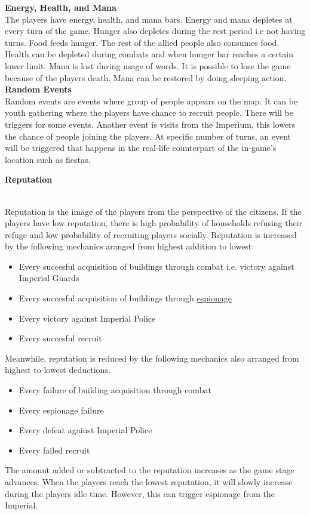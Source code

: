 \documentclass[11pt]{article}
\begin{document}
\textbf{Energy, Health, and Mana}\\
The players have energy, health, and mana bars. Energy  and mana depletes at every turn of the game. Hunger also depletes during the rest period i.e not having turns. Food feeds hunger. The rest of the allied people also consumes food. Health can be depleted during combats and when hunger bar reaches a certain lower limit. Mana is lost  during usage of words. It is possible to lose the game because of the players death. Mana can be restored by doing sleeping action.\\

\textbf{Random Events}\\
Random events are events where group of people appears on the map. It can be youth gathering where the players have chance to recruit people. There will be triggers for some events. Another event is visits from the Imperium, this lowers the chance of people joining the players.
At specific number of turns, an event will be triggered that happens in the real-life counterpart of the in-game's location such as fiestas.

\hypertarget{reputation}{\textbf{Reputation}}\\
Reputation is the image of the players from the perspective of the citizens. If the players have low reputation, there is high probability of households refusing their refuge and low probability of recruiting players socially.
Reputation is increased by the following mechanics aranged from highest addition to lowest:
\begin{itemize}
\item
  Every succesful acquisition of buildings through combat i.e. victory against Imperial Guards 
\item
  Every succesful acquisition of buildings through \hyperlink{espionage}{espionage}
\item
  Every victory against Imperial Police
\item
  Every succesful recruit
\end{itemize}
Meanwhile, reputation is reduced by the following mechanics also arranged from highest to lowest deductions.
\begin{itemize}
\item
  Every failure of building acquisition through combat
\item
  Every espionage failure
\item
  Every defeat against Imperial Police
\item
  Every failed recruit
\end{itemize}
The amount added or subtracted to the reputation increases as the game stage advances. When the players reach the lowest reputation, it will slowly increase during the players idle time. However, this can trigger espionage from the Imperial.\\
\end{document}
